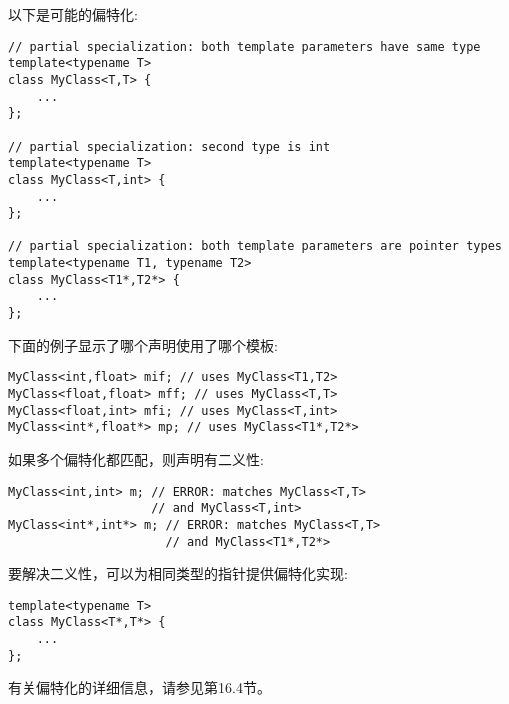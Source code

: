 以下是可能的偏特化:

\begin{lstlisting}[style=styleCXX]
// partial specialization: both template parameters have same type
template<typename T>
class MyClass<T,T> {
	...
};

// partial specialization: second type is int
template<typename T>
class MyClass<T,int> {
	...
};

// partial specialization: both template parameters are pointer types
template<typename T1, typename T2>
class MyClass<T1*,T2*> {
	...
};
\end{lstlisting}

下面的例子显示了哪个声明使用了哪个模板:

\begin{lstlisting}[style=styleCXX]
MyClass<int,float> mif; // uses MyClass<T1,T2>
MyClass<float,float> mff; // uses MyClass<T,T>
MyClass<float,int> mfi; // uses MyClass<T,int>
MyClass<int*,float*> mp; // uses MyClass<T1*,T2*>
\end{lstlisting}

如果多个偏特化都匹配，则声明有二义性:

\begin{lstlisting}[style=styleCXX]
MyClass<int,int> m; // ERROR: matches MyClass<T,T>
					// and MyClass<T,int>
MyClass<int*,int*> m; // ERROR: matches MyClass<T,T>
					  // and MyClass<T1*,T2*>
\end{lstlisting}

要解决二义性，可以为相同类型的指针提供偏特化实现:

\begin{lstlisting}[style=styleCXX]
template<typename T>
class MyClass<T*,T*> {
	...
};
\end{lstlisting}

有关偏特化的详细信息，请参见第16.4节。






